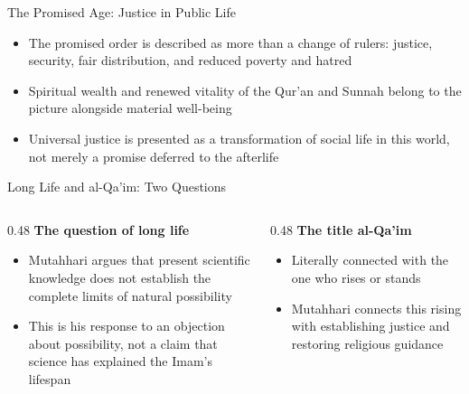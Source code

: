 \begin{frame}{The Promised Age: Justice in Public Life}
\begin{itemize}[itemsep=5pt]
  \item The promised order is described as more than a change of rulers: justice, security, fair distribution, and reduced poverty and hatred
  \item Spiritual wealth and renewed vitality of the Qur'an and Sunnah belong to the picture alongside material well-being
  \item Universal justice is presented as a transformation of social life in this world, not merely a promise deferred to the afterlife
\end{itemize}
\end{frame}

\begin{frame}{Long Life and al-Qa'im: Two Questions}
\begin{columns}[T]
  \begin{column}{0.48\textwidth}
    \textbf{The question of long life}
    \begin{itemize}[itemsep=4pt]
      \item Mutahhari argues that present scientific knowledge does not establish the complete limits of natural possibility
      \item This is his response to an objection about possibility, not a claim that science has explained the Imam's lifespan
    \end{itemize}
  \end{column}
  \begin{column}{0.48\textwidth}
    \textbf{The title al-Qa'im}
    \begin{itemize}[itemsep=4pt]
      \item Literally connected with the one who rises or stands
      \item Mutahhari connects this rising with establishing justice and restoring religious guidance
    \end{itemize}
  \end{column}
\end{columns}
\end{frame}


